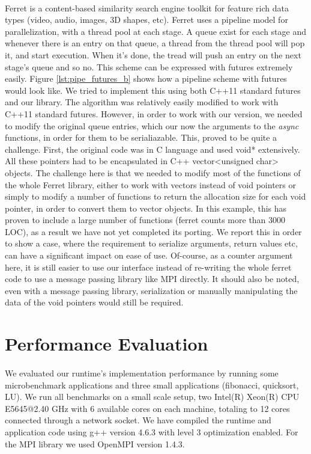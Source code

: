\paragraph{}
Ferret is a content-based similarity search engine toolkit for feature rich
data types (video, audio, images, 3D shapes, etc).
Ferret uses a pipeline model for parallelization, 
with a thread pool at each stage.  A queue exist for each stage and whenever
there is an entry on that queue, a thread from the thread pool will pop it, and start execution.  When it's
done, the tread will push an entry on the next stage's queue and so no.  This scheme can be expressed with
futures extremely easily.  Figure \ref{lst:pipe_futures_b} shows how a pipeline scheme with futures would 
look like.  We tried to implement this using both C++11 standard futures and our library.  The algorithm
was relatively easily modified to work with C++11 standard futures.  However, in order to work with our
version, we needed to modify the original queue entries, which our now the arguments to the \emph{async}
functions, in order for them to be serialiazable.  This, proved to be quite a challenge.  First, the original
code was in C language and used void* extensively.  All these pointers had to be encapsulated in 
C++ vector<unsigned char> objects.  The challenge here is that we needed to modify most of the functions
of the whole Ferret library, either to work with vectors instead of void pointers or simply to modify a 
number of functions to return the allocation size for each void pointer, in order to convert 
them to vector objects.  In this example, this has proven to include a large number of functions (ferret
counts more than 3000 LOC), as a result we have not yet completed its porting.  We report this in order
to show a case, where the requirement to serialize arguments, return values etc, can have a significant
impact on ease of use.  Of-course, as a counter argument here, it is still easier to 
use our interface instead of re-writing the whole ferret code to use a message passing library like MPI
directly.  It should also be noted, even with a message passing library, serialization or manually
manipulating the data of the void pointers would still be required.  

  
\section{Performance Evaluation}
\label{sect:eval_intro}
\paragraph{}
	We evaluated our runtime's implementation performance by running some microbenchmark applications and
three small applications (fibonacci, quicksort, LU).
We run all benchmarks on a small scale setup, two Intel(R) Xeon(R) 
CPU E5645@2.40 GHz with 6 available cores on each machine, totaling to 12 cores connected through 
a network socket. 
We have compiled the runtime and application code using g++ version 4.6.3 with 
level 3 optimization enabled.  For the MPI library we used OpenMPI version 1.4.3.

